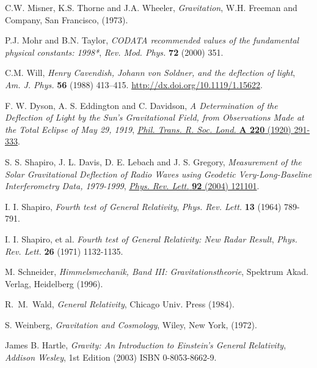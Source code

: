 \begin{thebibliography}{99}
 C.W. Misner, K.S. Thorne and J.A. Wheeler, {\em Gravitation},
W.H. Freeman and Company, San Francisco, (1973).

P.J. Mohr and B.N. Taylor, {\it CODATA recommended values of
the fundamental physical constants: 1998*}, {\sl Rev. Mod. Phys.} {\bf 72}
(2000) 351.

 C.M. Will, {\em Henry Cavendish, Johann von Soldner, and the deflection of light},  {\sl Am. J. Phys.} {\bf  56} (1988) 413--415. \url{http://dx.doi.org/10.1119/1.15622}.

F. W. Dyson, A. S. Eddington and C. Davidson, {\em A Determination of the Deflection of Light by the Sun's Gravitational Field, from Observations Made at the Total Eclipse of May 29, 1919}, \href{http://www.jstor.org/stable/91137}{{\sl Phil. Trans. R. Soc. Lond.} {\bf A 220} (1920) 291-333}.

 S. S. Shapiro, J. L. Davis, D. E. Lebach and J. S. Gregory, {\em Measurement of the Solar Gravitational Deflection of Radio Waves using Geodetic Very-Long-Baseline Interferometry Data, 1979-1999}, \href{http://link.aps.org/doi/10.1103/PhysRevLett.92.121101
}{{\sl Phys. Rev. Lett.} {\bf 92} (2004) 121101}.

 I. I. Shapiro,  {\em Fourth test of General Relativity}, {\sl Phys. Rev. Lett.} {\bf 13} (1964) 789-791.

 I. I. Shapiro, et al. {\em Fourth test of General Relativity: New Radar Result}, {\sl Phys. Rev. Lett.} {\bf 26} (1971) 1132-1135.

M. Schneider, {\em Himmelsmechanik, Band III:
Gravitationstheorie}, Spektrum Akad. Verlag, Heidelberg (1996).



 R.~M.~Wald, {\em General Relativity},  Chicago Univ. Press (1984).

 S. Weinberg, {\em Gravitation and Cosmology}, Wiley, New
York, (1972).









James B. Hartle, {\it Gravity: An Introduction to Einstein's General Relativity},
{\sl Addison Wesley}, 1st Edition (2003) ISBN 0-8053-8662-9.


\end{thebibliography}
